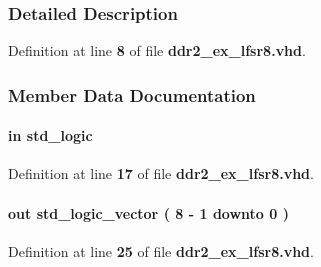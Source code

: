 \subsubsection{Detailed Description}


Definition at line {\bf 8} of file {\bf ddr2\+\_\+ex\+\_\+lfsr8.\+vhd}.



\subsubsection{Member Data Documentation}
\paragraph[{clk}]{ {\bfseries \textcolor{keywordflow}{in}\textcolor{vhdlchar}{ }} {\bfseries \textcolor{comment}{std\+\_\+logic}\textcolor{vhdlchar}{ }} \hspace{0.3cm}{\ttfamily [Port]}}\label{classddr2__ex__lfsr8_a4a4609c199d30b3adebbeb3a01276ec5}


Definition at line {\bf 17} of file {\bf ddr2\+\_\+ex\+\_\+lfsr8.\+vhd}.

\paragraph[{data}]{ {\bfseries \textcolor{keywordflow}{out}\textcolor{vhdlchar}{ }} {\bfseries \textcolor{comment}{std\+\_\+logic\+\_\+vector}\textcolor{vhdlchar}{ }\textcolor{vhdlchar}{(}\textcolor{vhdlchar}{ }\textcolor{vhdlchar}{ } \textcolor{vhdldigit}{8} \textcolor{vhdlchar}{-\/}\textcolor{vhdlchar}{ } \textcolor{vhdldigit}{1} \textcolor{vhdlchar}{ }\textcolor{keywordflow}{downto}\textcolor{vhdlchar}{ }\textcolor{vhdlchar}{ } \textcolor{vhdldigit}{0} \textcolor{vhdlchar}{ }\textcolor{vhdlchar}{)}\textcolor{vhdlchar}{ }} \hspace{0.3cm}{\ttfamily [Port]}}\label{classddr2__ex__lfsr8_a011d9da3ab9e01b05bd18d06fb36d4de}


Definition at line {\bf 25} of file {\bf ddr2\+\_\+ex\+\_\+lfsr8.\+vhd}.

